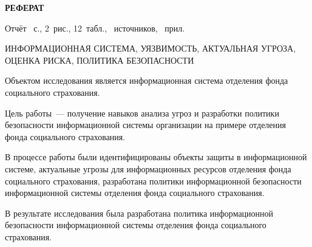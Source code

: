 \begin{center}
  \Large{\textbf{РЕФЕРАТ}}
\end{center}

Отчёт ~с., 2~рис., 12~табл.,
~источников, ~прил.

ИНФОРМАЦИОННАЯ СИСТЕМА, УЯЗВИМОСТЬ, АКТУАЛЬНАЯ УГРОЗА, ОЦЕНКА РИСКА,
ПОЛИТИКА БЕЗОПАСНОСТИ

Объектом исследования является информационная система отделения фонда
социального страхования.

Цель работы~--- получение навыков анализа угроз и разработки политики
безопасности информационной системы организации на примере отделения
фонда социального страхования.

В процессе работы были идентифицированы объекты защиты в
информационной системе, актуальные угрозы для информационных ресурсов
отделения фонда социального страхования, разработана политики
информационной безопасности информационной системы отделения фонда
социального страхования.

В результате исследования была разработана политика информационной
безопасности информационной системы отделения фонда социального
страхования. \newpage

